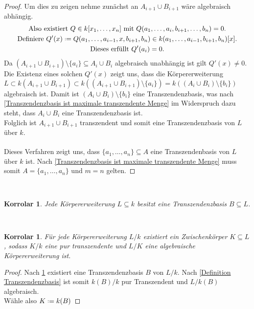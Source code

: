 \documentclass[10pt,a4paper]{report}
\newcounter{Aussage}[chapter]
\newtheorem{korrolar}[Aussage]{Korrolar}
\newcommand*{\defeq}{\mathrel{\vcenter{\baselineskip0.5ex \lineskiplimit0pt
                     \hbox{\scriptsize.}\hbox{\scriptsize.}}}%
                     =}
\begin{document}
\begin{proof}
Um dies zu zeigen nehme zunächst an $A_{i+1} \cup B_{i+1}$ wäre algebraisch abhängig.
\begin{gather*}
\text{Also existiert } Q \in k[x_1, \dots ,x_n] \text{ mit } Q(a_1, \dots ,a_i,b_{i+1},\dots,b_n) = 0. \\
\text{Definiere } Q'(x) \defeq Q(a_1,\dots,a_{i-1},x,b_{i+1},b_n) \in k(a_1,\dots,a_{i-1},b_{i+1},b_n)[x]. \\
\text{Dieses erfüllt } Q'(a_i) = 0.
\end{gather*}
Da $(A_{i+1} \cup B_{i+1}) \setminus \lbrace a_i \rbrace \subseteq A_i \cup B_i$ algebraisch unabhängig ist gilt $Q'(x) \neq 0$.\\
Die Existenz eines solchen $Q'(x)$ zeigt uns, dass die Körpererweiterung \\$L \subset k(A_{i+1} \cup B_{i+1}) \subset k((A_{i+1} \cup B_{i+1})\setminus\lbrace a_i \rbrace) = k((A_i \cup B_i)\setminus\lbrace b_i \rbrace)$ algebraisch ist. Damit ist $(A_i\cup B_i)\setminus\lbrace b_i \rbrace$ eine Transzendenzbasis, was nach \cref{Transzendenzbasis ist maximale transzendente Menge} im Widerspruch dazu steht, dass $A_i \cup B_i$ eine Transzendenzbasis ist.\\
Folglich ist $A_{i+1} \cup B_{i+1}$ transzendent und somit eine Transzendenzbasis von $L$ über $k$.\ \\
\ \\
Dieses Verfahren zeigt uns, dass $\lbrace a_1, \dots , a_n \rbrace \subseteq A$ eine Transzendenbasis von $L$ über $k$ ist. Nach \cref{Transzendenzbasis ist maximale transzendente Menge} muss somit $A = \lbrace a_1, \dots , a_n \rbrace$ und $m = n$ gelten.
\end{proof}


\ \\
\begin{korrolar}\label{Existenz von Transzendenzbasen}
Jede Körpererweiterung $L \subseteq k$ besitzt eine Transzendenzbasis $B \subseteq L$.
\end{korrolar}


\ \\
\begin{korrolar}\label{Transzendent ist pur transzendent plus algebraisch 1}
Für jede Körpererweiterung $L/k$ existiert ein Zwischenkörper $K \subseteq L$, sodass $K/k$ eine pur transzendente und $L/K$ eine algebraische Körpererweiterung ist.
\end{korrolar}
\begin{proof}
Nach \cref{Existenz von Transzendenzbasen} existiert eine Transzendenzbasis $B$ von $L/k$. Nach \cref{Definition Transzendenzbasis} ist somit $k(B)/k$ pur Transzendent und $L/k(B)$ algebraisch.\\
Wähle also $K \defeq k(B)$
\end{proof}
\end{document}
